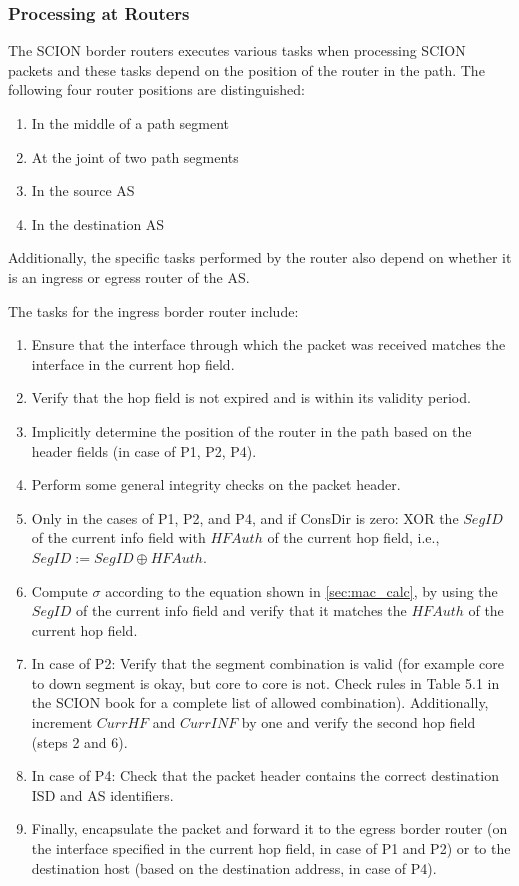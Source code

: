 \subsubsection{Processing at Routers}

The SCION border routers executes various tasks when processing SCION packets and these tasks depend on the position of the router in the path.
The following four router positions are distinguished:

\begin{enumerate}[label=P\arabic*]
    \item In the middle of a path segment
    \item At the joint of two path segments
    \item In the source AS
    \item In the destination AS
\end{enumerate}

Additionally, the specific tasks performed by the router also depend on whether it is an ingress or egress router of the AS.

The tasks for the ingress border router include:
\begin{enumerate}
    \item Ensure that the interface through which the packet was received matches the interface in the current hop field.
    \item Verify that the hop field is not expired and is within its validity period.
    \item Implicitly determine the position of the router in the path based on the header fields (in case of P1, P2, P4).
    \item Perform some general integrity checks on the packet header.
    \item Only in the cases of P1, P2, and P4, and if ConsDir is zero: XOR the $SegID$ of the current info field with $HFAuth$ of the current hop field, i.e., $SegID := SegID \oplus HFAuth$.
    \item Compute $\sigma$ according to the equation shown in \cref{sec:mac_calc}, by using the $SegID$ of the current info field and verify that it matches the $HFAuth$ of the current hop field.
    \item In case of P2: Verify that the segment combination is valid (for example core to down segment is okay, but core to core is not. Check rules in Table 5.1 in the SCION book \cite{Perrig2022} for a complete list of allowed combination).
    Additionally, increment $CurrHF$ and $CurrINF$ by one and verify the second hop field (steps 2 and 6).
    \item In case of P4: Check that the packet header contains the correct destination ISD and AS identifiers.
    \item Finally, encapsulate the packet and forward it to the egress border router (on the interface specified in the current hop field, in case of P1 and P2) or to the destination host (based on the destination address, in case of P4).
\end{enumerate}


